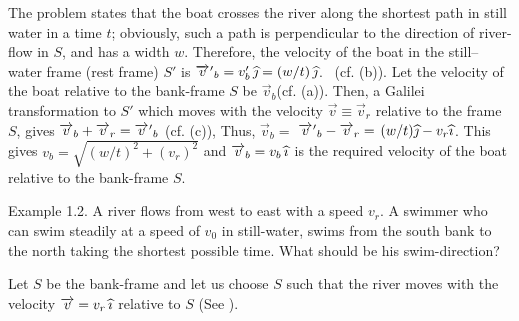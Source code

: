 The problem states that the boat crosses the river 
along the shortest path in still water in a time $t$; 
obviously, such a path is perpendicular to the 
direction of river-flow in $S$, and has a width $w$. 
Therefore, the velocity of the boat  in the 
still--water frame (rest frame) $S'$ is   ${\overrightarrow{v}\hspace*{.3pt}'}_b= 
v'_b\,{\widehat{\jmath}} = (w/t)\,{\widehat{\jmath}}$. \  (cf.  
(b)). Let the velocity of the boat relative to the 
bank-frame $S$ be $\vec{v}_b$\lbk  (cf.  
(a)). Then, a Galilei transformation to $S'$ which 
moves with the velocity $\vec{v}\equiv\vec{v}_r$ 
relative to the frame $S$, gives $\overrightarrow{v}_b +\overrightarrow{v}_r= 
{\overrightarrow{v}\hspace*{.3pt}'}_b$ (cf.  (c)), Thus, $ 
\vec{v}_b = $ ${\overrightarrow{v}\hspace*{.3pt}'}_b-\overrightarrow{v}_r =$ $ (w/t){\widehat{\jmath}} 
-v_r{\widehat{\imath}}$.  This gives $v_b=\sqrt{(w/t)^2+(v_r)^2}$ and 
 $\overrightarrow{v}_b =v_b\, {\widehat{\imath}} $ is the required velocity of 
the boat relative to the bank-frame $S$.%

Example 1.2.  A river flows from west to east with a 
speed  $v_r$. A swimmer who can swim  steadily at a 
speed of $v_0$ in still-water, swims from the south 
bank to the north taking the shortest possible time. 
What should be his swim-direction?

\newpage

\begin{figure}[H]
\begin{center}
\caption{} 
\label{fig1.3}
\end{center}
\end{figure}

\soln Let $S$ be the bank-frame and let us choose $S$ 
such that the river moves with the velocity $\overrightarrow{v} = 
v_r\,{\widehat{\imath}}$ relative to $S$ (See ). 
 
